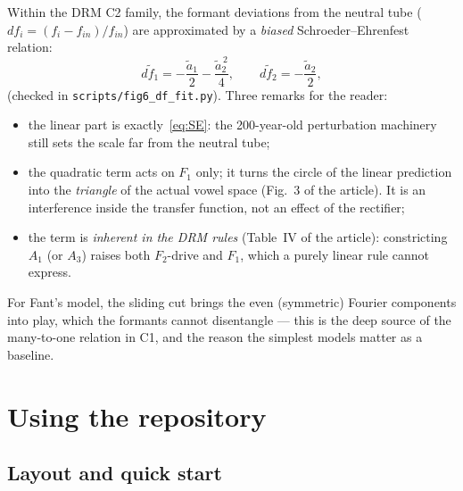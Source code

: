 \documentclass[11pt]{article}
\newcommand{\code}[1]{\texttt{#1}}
\theoremstyle{definition}
\theoremstyle{remark}
\newcommand{\Fone}{F_1}
\newcommand{\Ftwo}{F_2}
\begin{document}
Within the DRM C2 family, the formant deviations from the neutral tube
($df_i=(f_i-f_{in})/f_{in}$) are approximated by a \emph{biased}
Schroeder--Ehrenfest relation:
\begin{equation}
d\tilde f_1=-\frac{\tilde a_1}{2}-\frac{\tilde a_2^{\,2}}{4},
\qquad
d\tilde f_2=-\frac{\tilde a_2}{2},
\label{eq:bias}
\end{equation}
(checked in \code{scripts/fig6\_df\_fit.py}).  Three remarks for the
reader:
\begin{itemize}[nosep]
\item the linear part is exactly~\eqref{eq:SE}: the 200-year-old
      perturbation machinery still sets the scale far from the neutral
      tube;
\item the quadratic term acts on $\Fone$ only; it turns the circle of
      the linear prediction into the \emph{triangle} of the actual vowel
      space (Fig.~3 of the article).  It is an interference inside the
      transfer function, not an effect of the rectifier;
\item the term is \emph{inherent in the DRM rules} (Table~IV of the
      article): constricting $A_1$ (or $A_3$) raises both $\Ftwo$-drive
      and $\Fone$, which a purely linear rule cannot express.
\end{itemize}
For Fant's model, the sliding cut brings the even (symmetric) Fourier
components into play, which the formants cannot disentangle --- this is
the deep source of the many-to-one relation in C1, and the reason the
simplest models matter as a baseline.

\section{Using the repository}

\subsection{Layout and quick start}
\end{document}

